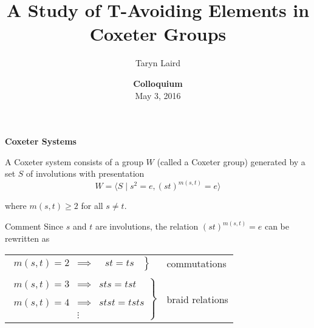 \documentclass{beamer}
\begin{document}
\def\newblock{\hskip .11em plus .33em minus .07em}

\title[A Study of T-Avoiding Elements in Coxeter Groups]
{\textbf{A Study of T-Avoiding Elements in Coxeter Groups}}
\author[T.M.~Laird]{Taryn Laird}

\vspace{1em}

\date[NAU]{\textbf{Colloquium}\\
May 3, 2016}

\frame{\titlepage}




\begin{frame}{\textbf{Coxeter Systems}}

\begin{definition}
A \alert{Coxeter system} consists of a group $W$ (called a \alert{Coxeter group}) generated by a set $S$ of involutions with presentation
\[ W=\langle S \mid s^2=e, (st)^{m(s,t)}=e \rangle \]

where $m(s,t) \geq 2$ for all $s \neq t$.
\end{definition}

\pause

\begin{block}{Comment}
Since $s$ and $t$ are involutions, the relation $(st)^{m(s,t)}=e$ can be 
rewritten as

\begin{center}
\begin{tabular}{ll}
$\left.\begin{array}{lcc}m(s,t)=2 & \implies &\ \ \, st=ts\ \   \end
{array}\right\}$&  \alert{commutations}\\
\\\pause
$\left.\begin{array}{lcc}m(s,t)=3 & \implies & sts=tst \\
& & \\
m(s,t)=4 & \implies & stst=tsts \\
 & \vdots &  \end{array}\right\}$ &\alert{braid relations}
\end{tabular}
\end{center}
\end{block}
\end{frame}
\end{document}

